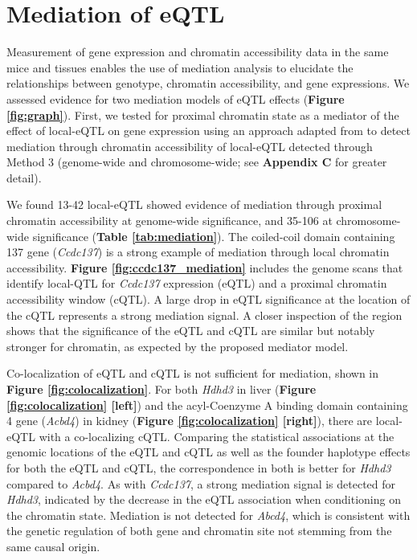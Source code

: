 \documentclass[9pt,twocolumn,twoside]{gsajnl}
\begin{document}
\section{Mediation of eQTL}

Measurement of gene expression and chromatin accessibility data in the same mice and tissues enables the use of mediation analysis to elucidate the relationships between genotype, chromatin accessibility, and gene expressions. We assessed evidence for two mediation models of eQTL effects (\textbf{Figure \ref{fig:graph}}). First, we tested for proximal chromatin state as a mediator of the effect of local-eQTL on gene expression using an approach adapted from \cite{Chick2016} to detect mediation through chromatin accessibility of local-eQTL detected through Method 3 (genome-wide and chromosome-wide; see \textbf{Appendix C} for greater detail).  


We found 13-42 local-eQTL showed evidence of mediation through proximal chromatin accessibility at genome-wide significance, and 35-106 at chromosome-wide significance (\textbf{Table \ref{tab:mediation}}). The coiled-coil domain containing 137 gene (\textit{Ccdc137}) is a strong example of mediation through local chromatin accessibility. \textbf{Figure \ref{fig:ccdc137_mediation}} includes the genome scans that identify local-QTL for \textit{Ccdc137} expression (eQTL) and a proximal chromatin accessibility window (cQTL). 
A large drop in eQTL significance at the location of the cQTL represents a strong mediation signal. A closer inspection of the region shows that the significance of the eQTL and cQTL are similar but notably stronger for chromatin, as expected by the proposed mediator model. 

Co-localization of eQTL and cQTL is not sufficient for mediation, shown in \textbf{Figure \ref{fig:colocalization}}. For both \textit{Hdhd3} in liver (\textbf{Figure \ref{fig:colocalization} [left]}) and the acyl-Coenzyme A binding domain containing 4 gene (\textit{Acbd4}) in kidney (\textbf{Figure \ref{fig:colocalization} [right]}), there are local-eQTL with a co-localizing cQTL. Comparing the statistical associations at the genomic locations of the eQTL and cQTL as well as the founder haplotype effects for both the eQTL and cQTL, the correspondence in both is better for \textit{Hdhd3} compared to \textit{Acbd4}. As with \textit{Ccdc137}, a strong mediation signal is detected for \textit{Hdhd3}, indicated by the decrease in the eQTL association when conditioning on the chromatin state. Mediation is not detected for \textit{Abcd4}, which is consistent with the genetic regulation of both gene and chromatin site not stemming from the same causal origin.
\end{document}
